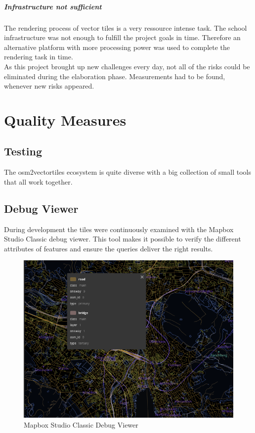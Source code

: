 \paragraph{Infrastructure not sufficient} The rendering process of vector tiles is a very ressource intense task. The school infrastructure was not enough to fulfill the project goals in time. Therefore an alternative platform with more processing power was used to complete the rendering task in time.\\

As this project brought up new challenges every day, not all of the risks could be eliminated during the elaboration phase. Measurements had to be found, whenever new risks appeared.

\newpage
\chapter{Quality Measures}\label{quality-measures}

\section{Testing}\label{testing}

The osm2vectortiles ecosystem is quite diverse with a big collection of small tools that all work together.

\section{Debug Viewer}

During development the tiles were continuously examined with the Mapbox Studio Classic debug viewer.
This tool makes it possible to verify the different attributes of features and ensure the queries deliver the right results.

\begin{figure}[H]
\centering
  \includegraphics[width=1\textwidth]{images/mapbox_studio_debug_viewer.png}
  \caption{Mapbox Studio Classic Debug Viewer}
\end{figure}

